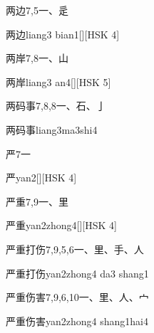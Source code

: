 \begin{entry}{两边}{7,5}{⼀、⾡}
  \begin{phonetics}{两边}{liang3 bian1}[][HSK 4]
  \end{phonetics}
\end{entry}

\begin{entry}{两岸}{7,8}{⼀、⼭}
  \begin{phonetics}{两岸}{liang3 an4}[][HSK 5]
  \end{phonetics}
\end{entry}

\begin{entry}{两码事}{7,8,8}{⼀、⽯、⼅}
  \begin{phonetics}{两码事}{liang3ma3shi4}
  \end{phonetics}
\end{entry}

\begin{entry}{严}{7}{⼀}
  \begin{phonetics}{严}{yan2}[][HSK 4]
  \end{phonetics}
\end{entry}

\begin{entry}{严重}{7,9}{⼀、⾥}
  \begin{phonetics}{严重}{yan2zhong4}[][HSK 4]
  \end{phonetics}
\end{entry}

\begin{entry}{严重打伤}{7,9,5,6}{⼀、⾥、⼿、⼈}
  \begin{phonetics}{严重打伤}{yan2zhong4 da3 shang1}
  \end{phonetics}
\end{entry}

\begin{entry}{严重伤害}{7,9,6,10}{⼀、⾥、⼈、⼧}
  \begin{phonetics}{严重伤害}{yan2zhong4 shang1hai4}
  \end{phonetics}
\end{entry}

